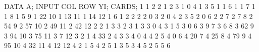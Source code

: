 \documentclass[]{book}
\newenvironment{Shaded}{\begin{snugshade}}{\end{snugshade}}
\newcommand{\DecValTok}[1]{\textcolor[rgb]{0.00,0.00,0.81}{#1}}
\newcommand{\NormalTok}[1]{#1}
\begin{document}
\begin{Shaded}
\begin{Highlighting}[]
\NormalTok{DATA A;}
\NormalTok{INPUT COL ROW YI;}
\NormalTok{CARDS;}
\DecValTok{1}   \DecValTok{1}   \DecValTok{2}
\DecValTok{2}   \DecValTok{1}   \DecValTok{2}
\DecValTok{3}   \DecValTok{1}   \DecValTok{0}
\DecValTok{4}   \DecValTok{1}   \DecValTok{3}
\DecValTok{5}   \DecValTok{1}   \DecValTok{1}
\DecValTok{6}   \DecValTok{1}   \DecValTok{1}
\DecValTok{7}   \DecValTok{1}   \DecValTok{1}
\DecValTok{8}   \DecValTok{1}   \DecValTok{5}
\DecValTok{9}   \DecValTok{1}   \DecValTok{22}
\DecValTok{10}  \DecValTok{1}   \DecValTok{13}
\DecValTok{11}  \DecValTok{1}   \DecValTok{14}
\DecValTok{12}  \DecValTok{1}   \DecValTok{6}
\DecValTok{1}   \DecValTok{2}   \DecValTok{2}
\DecValTok{2}   \DecValTok{2}   \DecValTok{0}
\DecValTok{3}   \DecValTok{2}   \DecValTok{0}
\DecValTok{4}   \DecValTok{2}   \DecValTok{3}
\DecValTok{5}   \DecValTok{2}   \DecValTok{0}
\DecValTok{6}   \DecValTok{2}   \DecValTok{2}
\DecValTok{7}   \DecValTok{2}   \DecValTok{7}
\DecValTok{8}   \DecValTok{2}   \DecValTok{54}
\DecValTok{9}   \DecValTok{2}   \DecValTok{57}
\DecValTok{10}  \DecValTok{2}   \DecValTok{49}
\DecValTok{11}  \DecValTok{2}   \DecValTok{42}
\DecValTok{12}  \DecValTok{2}   \DecValTok{2}
\DecValTok{1}   \DecValTok{3}   \DecValTok{3}
\DecValTok{2}   \DecValTok{3}   \DecValTok{1}
\DecValTok{3}   \DecValTok{3}   \DecValTok{0}
\DecValTok{4}   \DecValTok{3}   \DecValTok{1}
\DecValTok{5}   \DecValTok{3}   \DecValTok{0}
\DecValTok{6}   \DecValTok{3}   \DecValTok{9}
\DecValTok{7}   \DecValTok{3}   \DecValTok{6}
\DecValTok{8}   \DecValTok{3}   \DecValTok{62}
\DecValTok{9}   \DecValTok{3}   \DecValTok{94}
\DecValTok{10}  \DecValTok{3}   \DecValTok{75}
\DecValTok{11}  \DecValTok{3}   \DecValTok{7}
\DecValTok{12}  \DecValTok{3}   \DecValTok{2}
\DecValTok{1}   \DecValTok{4}   \DecValTok{33}
\DecValTok{2}   \DecValTok{4}   \DecValTok{3}
\DecValTok{3}   \DecValTok{4}   \DecValTok{0}
\DecValTok{4}   \DecValTok{4}   \DecValTok{2}
\DecValTok{5}   \DecValTok{4}   \DecValTok{0}
\DecValTok{6}   \DecValTok{4}   \DecValTok{20}
\DecValTok{7}   \DecValTok{4}   \DecValTok{25}
\DecValTok{8}   \DecValTok{4}   \DecValTok{79}
\DecValTok{9}   \DecValTok{4}   \DecValTok{95}
\DecValTok{10}  \DecValTok{4}   \DecValTok{32}
\DecValTok{11}  \DecValTok{4}   \DecValTok{12}
\DecValTok{12}  \DecValTok{4}   \DecValTok{2}
\DecValTok{1}   \DecValTok{5}   \DecValTok{4}
\DecValTok{2}   \DecValTok{5}   \DecValTok{1}
\DecValTok{3}   \DecValTok{5}   \DecValTok{3}
\DecValTok{4}   \DecValTok{5}   \DecValTok{2}
\DecValTok{5}   \DecValTok{5}   \DecValTok{6}

\end{Highlighting}
\end{Shaded}
\end{document}
